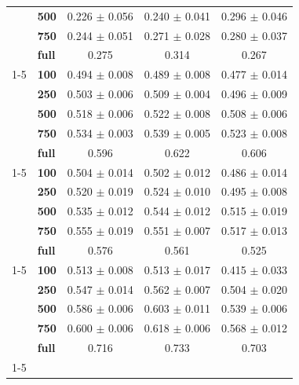 \begin{table}[t]
\begin{tabular}{llccc}
\textbf{} & \textbf{500} & 0.226 $\pm$ 0.056 & 0.240 $\pm$ 0.041 & 0.296 $\pm$ 0.046 \\
\textbf{} & \textbf{750} & 0.244 $\pm$ 0.051 & 0.271 $\pm$ 0.028 & 0.280 $\pm$ 0.037 \\
\textbf{} & \textbf{full} & 0.275 & 0.314 & 0.267 \\
\cline{1-5}
\multirow[t]{5}{*}{\textbf{Nig. Pidgin}} & \textbf{100} & 0.494 $\pm$ 0.008 & 0.489 $\pm$ 0.008 & 0.477 $\pm$ 0.014 \\
\textbf{} & \textbf{250} & 0.503 $\pm$ 0.006 & 0.509 $\pm$ 0.004 & 0.496 $\pm$ 0.009 \\
\textbf{} & \textbf{500} & 0.518 $\pm$ 0.006 & 0.522 $\pm$ 0.008 & 0.508 $\pm$ 0.006 \\
\textbf{} & \textbf{750} & 0.534 $\pm$ 0.003 & 0.539 $\pm$ 0.005 & 0.523 $\pm$ 0.008 \\
\textbf{} & \textbf{full} & 0.596 & 0.622 & 0.606 \\
\cline{1-5}
\multirow[t]{5}{*}{\textbf{Kiswahili}} & \textbf{100} & 0.504 $\pm$ 0.014 & 0.502 $\pm$ 0.012 & 0.486 $\pm$ 0.014 \\
\textbf{} & \textbf{250} & 0.520 $\pm$ 0.019 & 0.524 $\pm$ 0.010 & 0.495 $\pm$ 0.008 \\
\textbf{} & \textbf{500} & 0.535 $\pm$ 0.012 & 0.544 $\pm$ 0.012 & 0.515 $\pm$ 0.019 \\
\textbf{} & \textbf{750} & 0.555 $\pm$ 0.019 & 0.551 $\pm$ 0.007 & 0.517 $\pm$ 0.013 \\
\textbf{} & \textbf{full} & 0.576 & 0.561 & 0.525 \\
\cline{1-5}
\multirow[t]{5}{*}{\textbf{Yoruba}} & \textbf{100} & 0.513 $\pm$ 0.008 & 0.513 $\pm$ 0.017 & 0.415 $\pm$ 0.033 \\
\textbf{} & \textbf{250} & 0.547 $\pm$ 0.014 & 0.562 $\pm$ 0.007 & 0.504 $\pm$ 0.020 \\
\textbf{} & \textbf{500} & 0.586 $\pm$ 0.006 & 0.603 $\pm$ 0.011 & 0.539 $\pm$ 0.006 \\
\textbf{} & \textbf{750} & 0.600 $\pm$ 0.006 & 0.618 $\pm$ 0.006 & 0.568 $\pm$ 0.012 \\
\textbf{} & \textbf{full} & 0.716 & 0.733 & 0.703 \\
\cline{1-5}
\bottomrule
\end{tabular}
\end{table}
